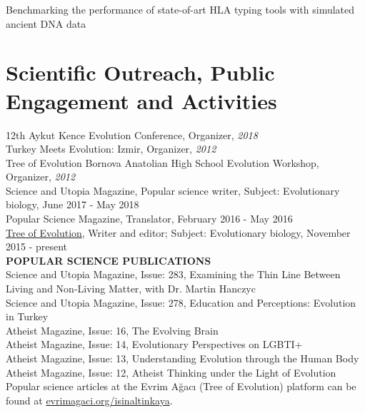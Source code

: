 \documentclass[letterpaper,10.5pt]{article}
\begin{document}
Benchmarking the performance of state-of-art HLA typing tools with simulated ancient DNA data \\

\section{Scientific Outreach, Public Engagement and Activities}
12th Aykut Kence Evolution Conference, Organizer, \textit{2018} \\
Turkey Meets Evolution: Izmir, Organizer, \textit{2012} \\
Tree of Evolution Bornova Anatolian High School Evolution Workshop, Organizer, \textit{2012} \\
Science and Utopia Magazine, Popular science writer, Subject: Evolutionary biology, June 2017 - May 2018 \\
Popular Science Magazine, Translator, February 2016 - May 2016 \\
\href{https://evrimagaci.org/isinaltinkaya/}{Tree of Evolution}, Writer and editor; Subject: Evolutionary biology, November 2015 - present \\
\medskip
\textbf{POPULAR SCIENCE PUBLICATIONS} \\
Science and Utopia Magazine, Issue: 283, Examining the Thin Line Between Living and Non-Living Matter, with Dr. Martin Hanczyc \\
Science and Utopia Magazine, Issue: 278, Education and Perceptions: Evolution in Turkey \\
Atheist Magazine, Issue: 16, The Evolving Brain \\
Atheist Magazine, Issue: 14, Evolutionary Perspectives on LGBTI+ \\
Atheist Magazine, Issue: 13, Understanding Evolution through the Human Body \\
Atheist Magazine, Issue: 12, Atheist Thinking under the Light of Evolution \\
Popular science articles at the Evrim A\u{g}ac{\i} (Tree of Evolution) platform can be found at  \href{https://evrimagaci.org/isinaltinkaya/}{evrimagaci.org/isinaltinkaya}. 
\end{document}
